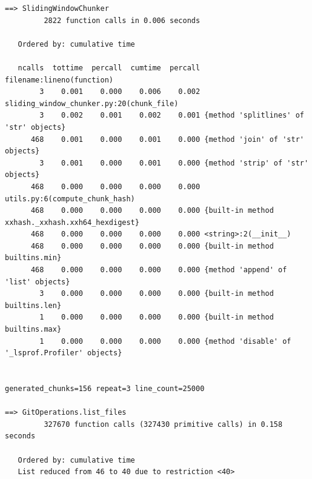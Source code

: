 \documentclass[a4paper,12pt]{article}
\begin{document}
\begin{lstlisting}[basicstyle=\ttfamily\fontsize{9}{9}\selectfont]
==> SlidingWindowChunker
         2822 function calls in 0.006 seconds

   Ordered by: cumulative time

   ncalls  tottime  percall  cumtime  percall filename:lineno(function)
        3    0.001    0.000    0.006    0.002 sliding_window_chunker.py:20(chunk_file)
        3    0.002    0.001    0.002    0.001 {method 'splitlines' of 'str' objects}
      468    0.001    0.000    0.001    0.000 {method 'join' of 'str' objects}
        3    0.001    0.000    0.001    0.000 {method 'strip' of 'str' objects}
      468    0.000    0.000    0.000    0.000 utils.py:6(compute_chunk_hash)
      468    0.000    0.000    0.000    0.000 {built-in method xxhash._xxhash.xxh64_hexdigest}
      468    0.000    0.000    0.000    0.000 <string>:2(__init__)
      468    0.000    0.000    0.000    0.000 {built-in method builtins.min}
      468    0.000    0.000    0.000    0.000 {method 'append' of 'list' objects}
        3    0.000    0.000    0.000    0.000 {built-in method builtins.len}
        1    0.000    0.000    0.000    0.000 {built-in method builtins.max}
        1    0.000    0.000    0.000    0.000 {method 'disable' of '_lsprof.Profiler' objects}


generated_chunks=156 repeat=3 line_count=25000

==> GitOperations.list_files
         327670 function calls (327430 primitive calls) in 0.158 seconds

   Ordered by: cumulative time
   List reduced from 46 to 40 due to restriction <40>


\end{lstlisting}
\end{document}
